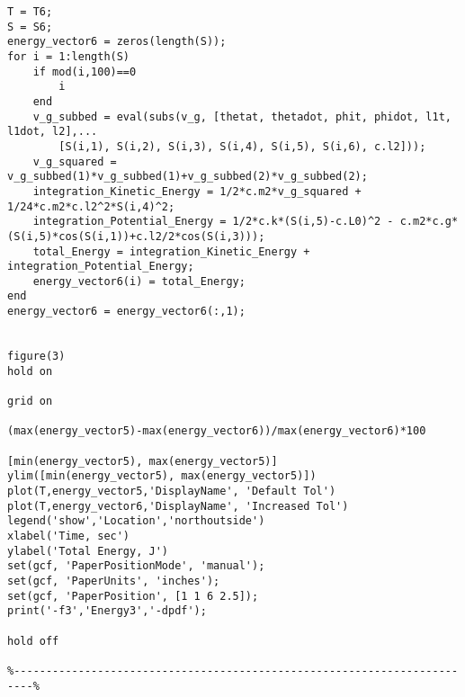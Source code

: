 \begin{lstlisting}[frame=lines,style=Matlab-editor,basicstyle = \mlttfamily]
T = T6;
S = S6;
energy_vector6 = zeros(length(S));
for i = 1:length(S)
    if mod(i,100)==0
        i
    end
    v_g_subbed = eval(subs(v_g, [thetat, thetadot, phit, phidot, l1t, l1dot, l2],...
        [S(i,1), S(i,2), S(i,3), S(i,4), S(i,5), S(i,6), c.l2]));
    v_g_squared = v_g_subbed(1)*v_g_subbed(1)+v_g_subbed(2)*v_g_subbed(2);
    integration_Kinetic_Energy = 1/2*c.m2*v_g_squared + 1/24*c.m2*c.l2^2*S(i,4)^2;
    integration_Potential_Energy = 1/2*c.k*(S(i,5)-c.L0)^2 - c.m2*c.g*(S(i,5)*cos(S(i,1))+c.l2/2*cos(S(i,3)));
    total_Energy = integration_Kinetic_Energy + integration_Potential_Energy;
    energy_vector6(i) = total_Energy;
end
energy_vector6 = energy_vector6(:,1);


figure(3)
hold on

grid on

(max(energy_vector5)-max(energy_vector6))/max(energy_vector6)*100

[min(energy_vector5), max(energy_vector5)]
ylim([min(energy_vector5), max(energy_vector5)])
plot(T,energy_vector5,'DisplayName', 'Default Tol')
plot(T,energy_vector6,'DisplayName', 'Increased Tol')
legend('show','Location','northoutside')
xlabel('Time, sec')
ylabel('Total Energy, J')
set(gcf, 'PaperPositionMode', 'manual');
set(gcf, 'PaperUnits', 'inches');
set(gcf, 'PaperPosition', [1 1 6 2.5]);
print('-f3','Energy3','-dpdf');

hold off

%-------------------------------------------------------------------------%
\end{lstlisting}
